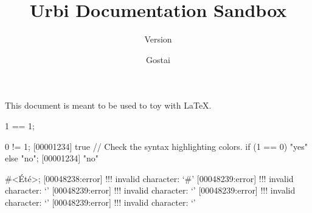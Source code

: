 \documentclass[openright,twoside,11pt]{book}
\title{Urbi Documentation Sandbox}
\subtitle{Version \VcsDescription}
\author{Gostai}
\begin{document}
This document is meant to be used to toy with \LaTeX{}.

\begin{urbiassert}
1 == 1;
\end{urbiassert}

\begin{urbiscript}[firstnumber=last]
0 != 1;
[00001234] true
// Check the syntax highlighting colors.
if (1 == 0) "yes" else "no";
[00001234] "no"
\end{urbiscript}

\begin{urbiunchecked}[escapeinside=<>,firstnumber=last]
#<Été>;
[00048238:error] !!! invalid character: `#'
[00048239:error] !!! invalid character: `'
[00048239:error] !!! invalid character: `'
[00048239:error] !!! invalid character: `'
[00048239:error] !!! invalid character: `'
\end{urbiunchecked}


\end{document}
